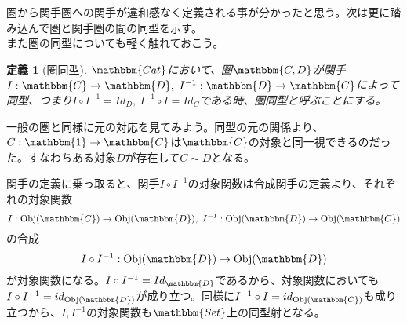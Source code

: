 \documentclass[uplatex,dvipdfmx]{jsarticle}
\newcommand{\cat}[1]{\mathbbm{#1}}
\newcommand{\arrow}{\rightarrow}
\newcommand{\functor}[3]{#1:\cat{#2}\arrow \cat{#3}}
\newcommand{\obj}[1]{\mathrm{Obj}(\cat{#1})}
\newcommand{\mor}[3]{#1:#2\arrow #3}
\newtheorem{define}{定義}[section]
\numberwithin{proof}{subsection}
\numberwithin{prop}{subsection}
\numberwithin{define}{subsection}
\begin{document}
  圏から関手圏への関手が違和感なく定義される事が分かったと思う。次は更に踏み込んで圏と関手圏の間の同型を示す。\\
  また圏の同型についても軽く触れておこう。
  \begin{define}[圏同型]
    $\cat{Cat}$において、圏$\cat{C,D}$が関手$\functor{I}{C}{D},\ \functor{I^{-1}}{D}{C}$によって同型、つまり$I\circ I^{-1}=Id_D,\ I^{-1}\circ I=Id_C$である時、圏同型と呼ぶことにする。
  \end{define}
  一般の圏と同様に元の対応を見てみよう。同型の元の関係より、$\functor{C}{1}{C}$は$\cat{C}$の対象と同一視できるのだった。すなわちある対象$D$が存在して$C\sim D$となる。\\

  \begin{center}
  \end{center}
  関手の定義に乗っ取ると、関手$I\circ I^{-1}$の対象関数は合成関手の定義より、それぞれの対象関数\[\mor{I}{\obj{C}}{\obj{D}},\ \mor{I^{-1}}{\obj{D}}{\obj{C}}\]の合成\[\mor{I\circ I^{-1}}{\obj{D}}{\obj{D}}\]が対象関数になる。$I\circ I^{-1}=Id_\cat{D}$であるから、対象関数においても$I\circ I^{-1}=id_{\obj{D}}$が成り立つ。同様に$I^{-1}\circ I=id_{\obj{C}}$も成り立つから、$I,I^{-1}$の対象関数も$\cat{Set}$上の同型射となる。
\end{document}
